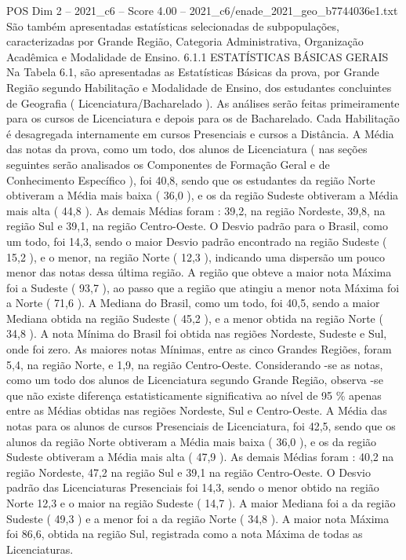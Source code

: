\begin{textsample}{POS Dim 2 – 2021\_c6 – Score 4.00 – 2021\_c6/enade\_2021\_geo\_b7744036e1.txt}
São também apresentadas estatísticas selecionadas de subpopulações, caracterizadas por Grande Região, Categoria Administrativa, Organização Acadêmica e Modalidade de Ensino. 6.1.1 ESTATÍSTICAS BÁSICAS GERAIS Na Tabela 6.1, são apresentadas as Estatísticas Básicas da prova, por Grande Região segundo Habilitação e Modalidade de Ensino, dos estudantes concluintes de Geografia ( Licenciatura/Bacharelado ).
As análises serão feitas primeiramente para os cursos de Licenciatura e depois para os de Bacharelado.
Cada Habilitação é desagregada internamente em cursos Presenciais e cursos a Distância.
A Média das notas da prova, como um todo, dos alunos de Licenciatura ( nas seções seguintes serão analisados os Componentes de Formação Geral e de Conhecimento Específico ), foi 40,8, sendo que os estudantes da região Norte obtiveram a Média mais baixa ( 36,0 ), e os da região Sudeste obtiveram a Média mais alta ( 44,8 ).
As demais Médias foram : 39,2, na região Nordeste, 39,8, na região Sul e 39,1, na região Centro-Oeste.
O Desvio padrão para o Brasil, como um todo, foi 14,3, sendo o maior Desvio padrão encontrado na região Sudeste ( 15,2 ), e o menor, na região Norte ( 12,3 ), indicando uma dispersão um pouco menor das notas dessa última região.
A região que obteve a maior nota Máxima foi a Sudeste ( 93,7 ), ao passo que a região que atingiu a menor nota Máxima foi a Norte ( 71,6 ).
A Mediana do Brasil, como um todo, foi 40,5, sendo a maior Mediana obtida na região Sudeste ( 45,2 ), e a menor obtida na região Norte ( 34,8 ).
A nota Mínima do Brasil foi obtida nas regiões Nordeste, Sudeste e Sul, onde foi zero.
As maiores notas Mínimas, entre as cinco Grandes Regiões, foram 5,4, na região Norte, e 1,9, na região Centro-Oeste.
Considerando -se as notas, como um todo dos alunos de Licenciatura segundo Grande Região, observa -se que não existe diferença estatisticamente significativa ao nível de 95 \% apenas entre as Médias obtidas nas regiões Nordeste, Sul e Centro-Oeste.
A Média das notas para os alunos de cursos Presenciais de Licenciatura, foi 42,5, sendo que os alunos da região Norte obtiveram a Média mais baixa ( 36,0 ), e os da região Sudeste obtiveram a Média mais alta ( 47,9 ).
As demais Médias foram : 40,2 na região Nordeste, 47,2 na região Sul e 39,1 na região Centro-Oeste.
O Desvio padrão das Licenciaturas Presenciais foi 14,3, sendo o menor obtido na região Norte 12,3 e o maior na região Sudeste ( 14,7 ).
A maior Mediana foi a da região Sudeste ( 49,3 ) e a menor foi a da região Norte ( 34,8 ).
A maior nota Máxima foi 86,6, obtida na região Sul, registrada como a nota Máxima de todas as Licenciaturas.

\end{textsample}
